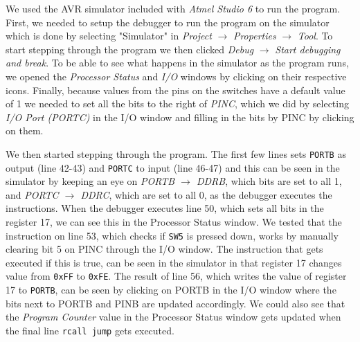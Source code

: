 We used the AVR simulator included with \emph{Atmel Studio 6} to run the program. First, we needed to setup the debugger to run the program on the simulator which is done by selecting "Simulator" in \emph{Project} $\rightarrow$ \emph{Properties} $\rightarrow$ \emph{Tool}. To start stepping through the program we then clicked \emph{Debug} $\rightarrow$ \emph{Start debugging and break}. To be able to see what happens in the simulator as the program runs, we opened the \emph{Processor Status} and \emph{I/O} windows by clicking on their respective icons. Finally, because values from the pins on the switches have a default value of 1 we needed to set all the bits to the right of \emph{PINC}, which we did by selecting \emph{I/O Port (PORTC)} in the I/O window and filling in the bits by PINC by clicking on them.

We then started stepping through the program. The first few lines sets \texttt{PORTB} as output (line 42-43) and \texttt{PORTC} to input (line 46-47) and this can be seen in the simulator by keeping an eye on \emph{PORTB $\rightarrow$ DDRB}, which bits are set to all 1, and \emph{PORTC $\rightarrow$ DDRC}, which are set to all 0, as the debugger executes the instructions. When the debugger executes line 50, which sets all bits in the register 17, we can see this in the Processor Status window. We tested that the instruction on line 53, which checks if \texttt{SW5} is pressed down, works by manually clearing bit 5 on PINC through the I/O window. The instruction that gets executed if this is true, can be seen in the simulator in that register 17 changes value from \texttt{0xFF} to \texttt{0xFE}. The result of line 56, which writes the value of register 17 to \texttt{PORTB}, can be seen by clicking on PORTB in the I/O window where the bits next to PORTB and PINB are updated accordingly. We could also see that the \emph{Program Counter} value in the Processor Status window gets updated when the final line \texttt{rcall jump} gets executed.